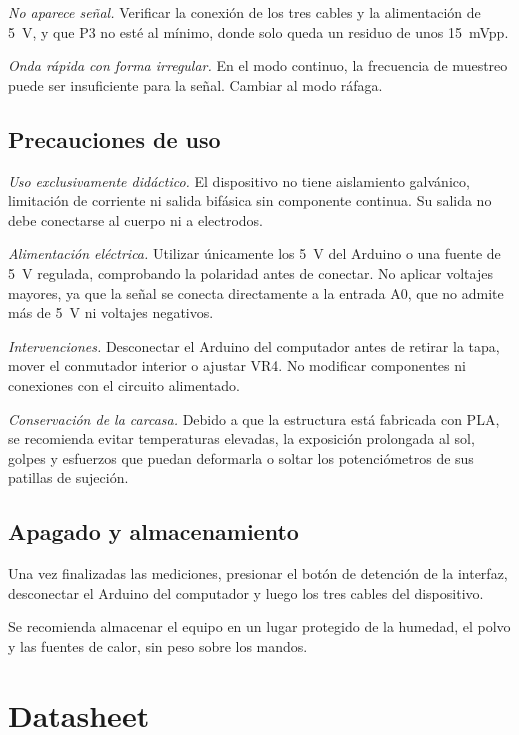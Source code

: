 \documentclass[conference]{IEEEtran}
\begin{document}
\textit{No aparece señal.} Verificar la conexión de los tres cables y la alimentación de 5~V, y que P3 no esté al mínimo, donde solo queda un residuo de unos 15~mVpp.

\textit{Onda rápida con forma irregular.} En el modo continuo, la frecuencia de muestreo puede ser insuficiente para la señal. Cambiar al modo ráfaga.

\subsection{Precauciones de uso}

\textit{Uso exclusivamente didáctico.} El dispositivo no tiene aislamiento galvánico, limitación de corriente ni salida bifásica sin componente continua. Su salida no debe conectarse al cuerpo ni a electrodos.

\textit{Alimentación eléctrica.} Utilizar únicamente los 5~V del Arduino o una fuente de 5~V regulada, comprobando la polaridad antes de conectar. No aplicar voltajes mayores, ya que la señal se conecta directamente a la entrada A0, que no admite más de 5~V ni voltajes negativos.

\textit{Intervenciones.} Desconectar el Arduino del computador antes de retirar la tapa, mover el conmutador interior o ajustar VR4. No modificar componentes ni conexiones con el circuito alimentado.

\textit{Conservación de la carcasa.} Debido a que la estructura está fabricada con PLA, se recomienda evitar temperaturas elevadas, la exposición prolongada al sol, golpes y esfuerzos que puedan deformarla o soltar los potenciómetros de sus patillas de sujeción.

\subsection{Apagado y almacenamiento}

Una vez finalizadas las mediciones, presionar el botón de detención de la interfaz, desconectar el Arduino del computador y luego los tres cables del dispositivo.

Se recomienda almacenar el equipo en un lugar protegido de la humedad, el polvo y las fuentes de calor, sin peso sobre los mandos.

\section{Datasheet}
\end{document}
